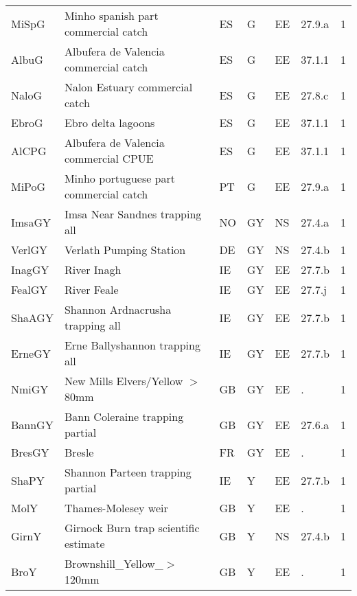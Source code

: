 \begin{table}[htbp]
\begin{tabularx}{\textwidth}{p{1.3cm}p{6.5cm}p{1cm}p{1cm}p{1cm}p{1cm}p{1.4cm}}
  MiSpG & Minho spanish part commercial catch & ES & G & EE & 27.9.a &   1 \\ 
  AlbuG & Albufera de Valencia commercial catch & ES & G & EE & 37.1.1 &   1 \\ 
  NaloG & Nalon Estuary commercial catch & ES & G & EE & 27.8.c &   1 \\ 
  EbroG & Ebro delta lagoons & ES & G & EE & 37.1.1 &   1 \\ 
  AlCPG & Albufera de Valencia commercial CPUE & ES & G & EE & 37.1.1 &   1 \\ 
  MiPoG & Minho portuguese part commercial catch & PT & G & EE & 27.9.a &   1 \\ 
  ImsaGY & Imsa Near Sandnes trapping all & NO & GY & NS & 27.4.a &   1 \\ 
  VerlGY & Verlath Pumping Station & DE & GY & NS & 27.4.b &   1 \\ 
  InagGY & River Inagh & IE & GY & EE & 27.7.b &   1 \\ 
  FealGY & River Feale & IE & GY & EE & 27.7.j &   1 \\ 
  ShaAGY & Shannon Ardnacrusha trapping all & IE & GY & EE & 27.7.b &   1 \\ 
  ErneGY & Erne Ballyshannon trapping all & IE & GY & EE & 27.7.b &   1 \\ 
  NmiGY & New Mills Elvers/Yellow $>$80mm & GB & GY & EE & . &   1 \\ 
  BannGY & Bann Coleraine trapping partial & GB & GY & EE & 27.6.a &   1 \\ 
  BresGY & Bresle & FR & GY & EE & . &   1 \\ 
  ShaPY & Shannon Parteen trapping partial & IE & Y & EE & 27.7.b &   1 \\ 
  MolY & Thames-Molesey weir & GB & Y & EE & . &   1 \\ 
  GirnY & Girnock Burn trap scientific estimate & GB & Y & NS & 27.4.b &   1 \\ 
  BroY & Brownshill\_Yellow\_$>$120mm & GB & Y & EE & . &   1 \\ 
   \hline
\end{tabularx}
\end{table}
